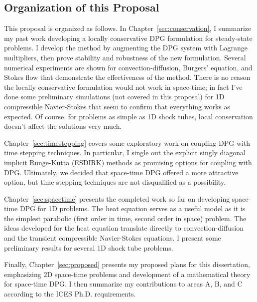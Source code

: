 \documentclass[Proposal.tex]{subfiles}
\begin{document}
\subsection{Organization of this Proposal}
This proposal is organized as follows. 
In Chapter~\ref{sec:conservation}, I summarize my past work developing a locally conservative DPG formulation for steady-state problems.
I develop the method by augmenting the DPG system with Lagrange multipliers, then prove stability and robustness of the new formulation.
Several numerical experiments are shown for convection-diffusion, Burgers' equation, and Stokes flow that demonstrate the effectiveness of the method.
There is no reason the locally conservative formulation would not work in space-time; in fact I've done some preliminary simulations 
(not covered in this proposal) for 1D compressible Navier-Stokes that seem to confirm that everything works as expected. 
Of course, for problems as simple as 1D shock tubes, local conservation doesn't affect the solutions very much.

Chapter~\ref{sec:timestepping} covers some exploratory work on coupling DPG with time stepping techniques.
In particular, I single out the explicit singly diagonal implicit Runge-Kutta (ESDIRK) methods as promising options for
coupling with DPG.
Ultimately, we decided that space-time DPG offered a more attractive option, but time stepping techniques are not disqualified as a possibility.

Chapter~\ref{sec:spacetime} presents the completed work so far on developing space-time DPG for 1D problems.
The heat equation serves as a useful model as it is the simplest parabolic (first order in time, second order in space) problem.
The ideas developed for the heat equation translate directly to convection-diffusion and the transient compressible Navier-Stokes equations.
I present some preliminary results for several 1D shock tube problems.

Finally, Chapter~\ref{sec:proposed} presents my proposed plans for this dissertation, emphasizing 2D space-time problems and development of 
a mathematical theory for space-time DPG.
I then summarize my contributions to areas A, B, and C according to the ICES Ph.D. requirements.
\end{document}

